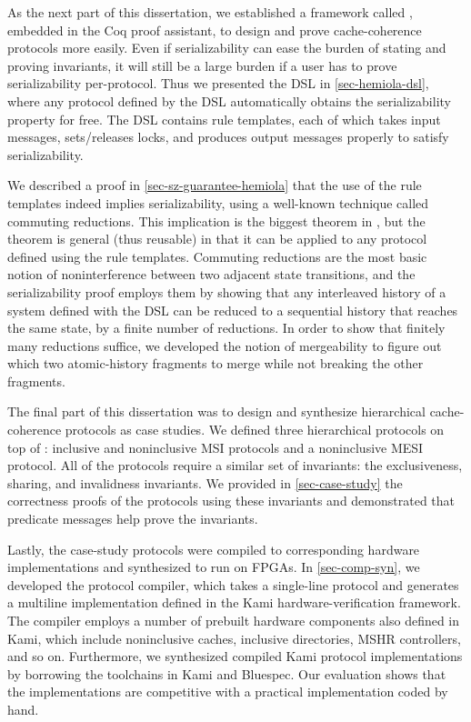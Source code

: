 As the next part of this dissertation, we established a framework called \hemiola{}, embedded in the Coq proof assistant, to design and prove cache-coherence protocols more easily.
Even if serializability can ease the burden of stating and proving invariants, it will still be a large burden if a user has to prove serializability per-protocol.
Thus we presented the \hemiola{} DSL in \autoref{sec-hemiola-dsl}, where any protocol defined by the DSL automatically obtains the serializability property for free.
The DSL contains rule templates, each of which takes input messages, sets/releases locks, and produces output messages properly to satisfy serializability.

We described a proof in \autoref{sec-sz-guarantee-hemiola} that the use of the rule templates indeed implies serializability, using a well-known technique called commuting reductions.
This implication is the biggest theorem in \hemiola{}, but the theorem is general (thus reusable) in that it can be applied to any protocol defined using the rule templates.
Commuting reductions are the most basic notion of noninterference between two adjacent state transitions, and the serializability proof employs them by showing that any interleaved history of a system defined with the \hemiola{} DSL can be reduced to a sequential history that reaches the same state, by a finite number of reductions.
In order to show that finitely many reductions suffice, we developed the notion of mergeability to figure out which two atomic-history fragments to merge while not breaking the other fragments.

The final part of this dissertation was to design and synthesize hierarchical cache-coherence protocols as case studies.
We defined three hierarchical protocols on top of \hemiola{}: inclusive and noninclusive MSI protocols and a noninclusive MESI protocol.
All of the protocols require a similar set of invariants: the exclusiveness, sharing, and invalidness invariants.
We provided in \autoref{sec-case-study} the correctness proofs of the protocols using these invariants and demonstrated that predicate messages help prove the invariants.

Lastly, the case-study protocols were compiled to corresponding hardware implementations and synthesized to run on FPGAs.
In \autoref{sec-comp-syn}, we developed the protocol compiler, which takes a single-line \hemiola{} protocol and generates a multiline implementation defined in the Kami hardware-verification framework.
The compiler employs a number of prebuilt hardware components also defined in Kami, which include noninclusive caches, inclusive directories, MSHR controllers, and so on.
Furthermore, we synthesized compiled Kami protocol implementations by borrowing the toolchains in Kami and Bluespec.
Our evaluation shows that the implementations are competitive with a practical implementation coded by hand.

